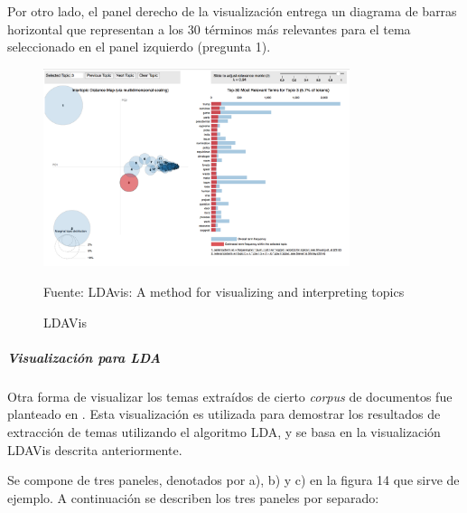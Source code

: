     Por otro lado, el panel derecho de la visualización entrega un diagrama de barras horizontal que representan a los 30 términos más relevantes para el tema seleccionado en el panel izquierdo (pregunta 1).
    \begin{figure}[H]
        \centering
        \includegraphics[width=0.8\textwidth]{figures/LDAVis.png}
        \caption{\label{fig:LDAVis} LDAVis} Fuente: LDAvis: A method for visualizing and interpreting topics \cite{sievert2014ldavis}
    \end{figure}
\subparagraph{Visualización para LDA}
\subparagraph*{}
    Otra forma de visualizar los temas extraídos de cierto \textit{corpus} de documentos fue planteado en \cite{kucher2018analysis}. Esta visualización es utilizada para demostrar los resultados de extracción de temas utilizando el algoritmo LDA, y se basa en la visualización LDAVis descrita anteriormente. 
    
   Se compone de tres paneles, denotados por a), b) y c) en la figura 14 que sirve de ejemplo. A continuación se describen los tres paneles por separado:
    
